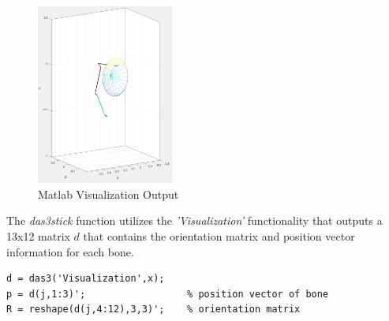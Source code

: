  \begin{figure}[ht]
    \centering
    \includegraphics[width=0.4\textwidth]{Pictures/DAS/das3stick.png}
    \caption{Matlab Visualization Output}
    \label{fig:das3stick}
\end{figure}

The \textit{das3stick} function utilizes the \textit{'Visualization'} functionality that outputs a 13x12 matrix $d$ that contains the orientation matrix and position vector information for each bone.

\begin{lstlisting}[style=Matlab-editor]
d = das3('Visualization',x);   
p = d(j,1:3)';					% position vector of bone
R = reshape(d(j,4:12),3,3)';	% orientation matrix
 \end{lstlisting}

